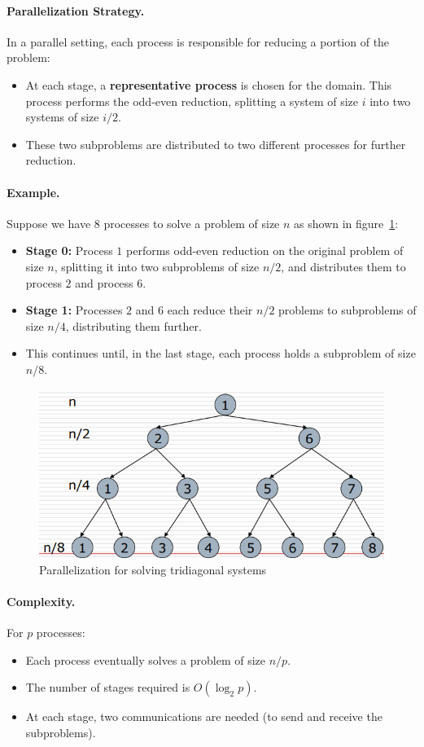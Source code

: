 \documentclass[12pt]{book}
\begin{document}
\paragraph{Parallelization Strategy.}
In a parallel setting, each process is responsible for reducing a portion of the problem:
\begin{itemize}
    \item At each stage, a \textbf{representative process} is chosen for the domain. This process performs the odd-even reduction, splitting a system of size $i$ into two systems of size $i/2$.
    \item These two subproblems are distributed to two different processes for further reduction.
\end{itemize}

\paragraph{Example.}
Suppose we have $8$ processes to solve a problem of size $n$ as shown in figure~\ref{fig:tridiagsys}:
\begin{itemize}
    \item \textbf{Stage 0:} Process $1$ performs odd-even reduction on the original problem of size $n$, splitting it into two subproblems of size $n/2$, and distributes them to process $2$ and process $6$.
    \item \textbf{Stage 1:} Processes $2$ and $6$ each reduce their $n/2$ problems to subproblems of size $n/4$, distributing them further.
    \item This continues until, in the last stage, each process holds a subproblem of size $n/8$.
\end{itemize}
\begin{figure}[ht]
    \centering
    \includegraphics[width=0.5\linewidth]{images/Tridiagsolve.png}
    \caption{Parallelization for solving tridiagonal systems}
    \label{fig:tridiagsys}
\end{figure}
\paragraph{Complexity.}
For $p$ processes:
\begin{itemize}
    \item Each process eventually solves a problem of size $n/p$.
    \item The number of stages required is $O(\log_2 p)$.
    \item At each stage, two communications are needed (to send and receive the subproblems).
\end{itemize}
\end{document}
